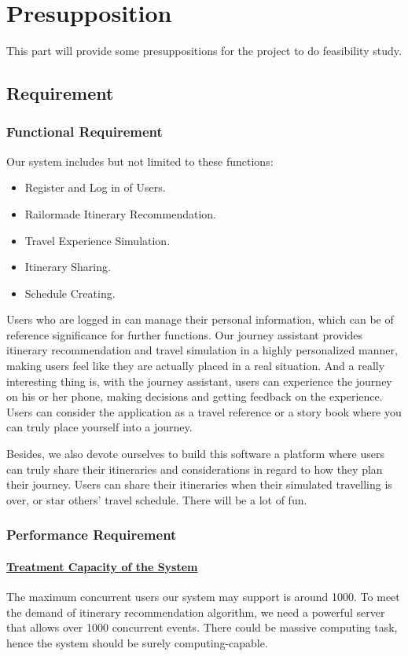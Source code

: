\documentclass[10pt]{article}
\begin{document}
\section{Presupposition}
This part will provide some presuppositions for the project to do feasibility study.

\subsection{Requirement}
\subsubsection{Functional Requirement}
Our system includes but not limited to these functions: 

\begin{itemize}
  \item Register and Log in of Users.
  \item Railormade Itinerary Recommendation.
  \item Travel Experience Simulation.
  \item Itinerary Sharing.
  \item Schedule Creating.
\end{itemize}

Users who are logged in can manage their personal information, which can be of reference significance for further functions. Our journey assistant provides itinerary recommendation and travel simulation in a highly personalized manner, making users feel like they are actually placed in a real situation. And a really interesting thing is, with the journey assistant, users can experience the journey on his or her phone, making decisions and getting feedback on the experience. Users can consider the application as a travel reference or a story book where you can truly place yourself into a journey. 

Besides, we also devote ourselves to build this software a platform where users can truly share their itineraries and considerations in regard to how they plan their journey. Users can share their itineraries when their simulated travelling is over, or star others' travel schedule. There will be a lot of fun.

\subsubsection{Performance Requirement}
\paragraph{\underline{Treatment Capacity of the System}} The maximum concurrent users our system may support is around 1000. To meet the demand of itinerary recommendation algorithm, we need a powerful server that allows over 1000 concurrent events. There could be massive computing task, hence the system should be surely computing-capable.
\end{document}
